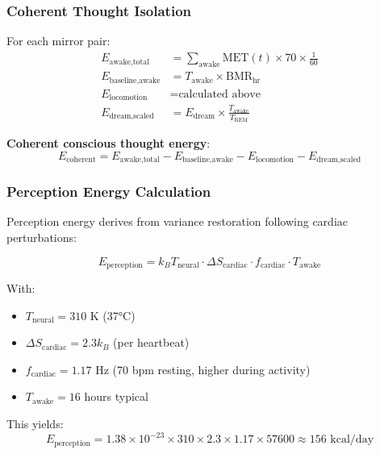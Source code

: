 \documentclass[12pt]{article}
\theoremstyle{remark}
\begin{document}
\subsubsection{Coherent Thought Isolation}

For each mirror pair:
\begin{align}
E_{\text{awake,total}} &= \sum_{\text{awake}} \text{MET}(t) \times 70 \times \frac{1}{60} \\
E_{\text{baseline,awake}} &= T_{\text{awake}} \times \text{BMR}_{\text{hr}} \\
E_{\text{locomotion}} &= \text{calculated above} \\
E_{\text{dream,scaled}} &= E_{\text{dream}} \times \frac{T_{\text{awake}}}{T_{\text{REM}}}
\end{align}

\textbf{Coherent conscious thought energy}:
\begin{equation}
\boxed{E_{\text{coherent}} = E_{\text{awake,total}} - E_{\text{baseline,awake}} - E_{\text{locomotion}} - E_{\text{dream,scaled}}}
\end{equation}

\subsubsection{Perception Energy Calculation}

Perception energy derives from variance restoration following cardiac perturbations:

\begin{equation}
E_{\text{perception}} = k_B T_{\text{neural}} \cdot \Delta S_{\text{cardiac}} \cdot f_{\text{cardiac}} \cdot T_{\text{awake}}
\end{equation}

With:
\begin{itemize}
\item $T_{\text{neural}} = 310$ K (37°C)
\item $\Delta S_{\text{cardiac}} = 2.3 k_B$ (per heartbeat)
\item $f_{\text{cardiac}} = 1.17$ Hz (70 bpm resting, higher during activity)
\item $T_{\text{awake}} = 16$ hours typical
\end{itemize}

This yields:
\begin{equation}
E_{\text{perception}} = 1.38 \times 10^{-23} \times 310 \times 2.3 \times 1.17 \times 57600 \approx 156 \text{ kcal/day}
\end{equation}
\end{document}
